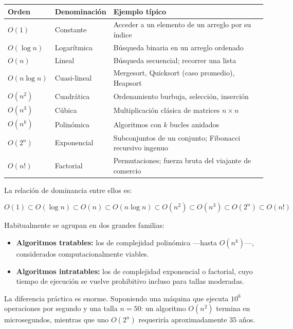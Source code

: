 \documentclass[12pt]{article}
\begin{document}
\begin{center}
\small
\begin{tabular}{lll}
\toprule
\textbf{Orden} & \textbf{Denominación} & \textbf{Ejemplo típico} \\
\midrule
$O(1)$        & Constante      & Acceder a un elemento de un arreglo por su índice \\
$O(\log n)$   & Logarítmica    & Búsqueda binaria en un arreglo ordenado \\
$O(n)$        & Lineal         & Búsqueda secuencial; recorrer una lista \\
$O(n \log n)$ & Cuasi-lineal   & Mergesort, Quicksort (caso promedio), Heapsort \\
$O(n^2)$      & Cuadrática     & Ordenamiento burbuja, selección, inserción \\
$O(n^3)$      & Cúbica         & Multiplicación clásica de matrices $n \times n$ \\
$O(n^k)$      & Polinómica     & Algoritmos con $k$ bucles anidados \\
$O(2^n)$      & Exponencial    & Subconjuntos de un conjunto; Fibonacci recursivo ingenuo \\
$O(n!)$       & Factorial      & Permutaciones; fuerza bruta del viajante de comercio \\
\bottomrule
\end{tabular}
\end{center}

La relación de dominancia entre ellos es:

\[
O(1) \subset O(\log n) \subset O(n) \subset O(n \log n) \subset O(n^2) \subset O(n^3) \subset O(2^n) \subset O(n!)
\]

Habitualmente se agrupan en dos grandes familias:

\begin{itemize}[leftmargin=2em]
    \item \textbf{Algoritmos tratables:} los de complejidad polinómica —hasta $O(n^k)$—, considerados computacionalmente viables.
    \item \textbf{Algoritmos intratables:} los de complejidad exponencial o factorial, cuyo tiempo de ejecución se vuelve prohibitivo incluso para tallas moderadas.
\end{itemize}

La diferencia práctica es enorme. Suponiendo una máquina que ejecuta $10^6$ operaciones por segundo y una talla $n = 50$: un algoritmo $O(n^2)$ termina en microsegundos, mientras que uno $O(2^n)$ requeriría aproximadamente $35$ años.
\end{document}

